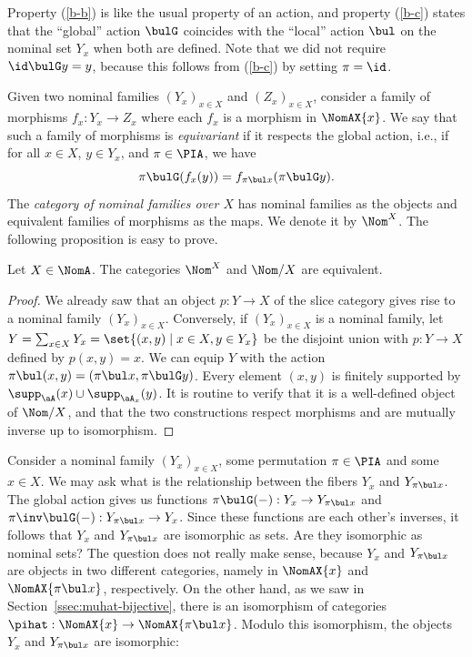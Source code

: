 \documentclass[twoside,11pt]{entics}
\begin{document}
Property (\ref{b-b}) is like the usual property of an action, and
property (\ref{b-c}) states that the ``global'' action $\bulG$
coincides with the ``local'' action $\bul$ on the nominal set $Y_x$
when both are defined. Note that we did not require $\id\bulG y =
y$, because this follows from (\ref{b-c}) by setting $\pi=\id$.

Given two nominal families $(Y_x)_{x\in X}$ and $(Z_x)_{x\in X}$,
consider a family of morphisms $f_x:Y_x\to Z_x$ where each $f_x$ is a
morphism in $\NomAX{x}$. We say that such a family of morphisms is
\emph{equivariant} if it respects the global action, i.e., if for all
$x\in X$, $y\in Y_x$, and $\pi\in\PIA$, we have
\[
\pi\bulG (f_x(y)) = f_{\pi\bul x}(\pi\bulG y).
\]
The \emph{category of nominal families over $X$} has nominal families
as the objects and equivalent families of morphisms as the maps. We
denote it by $\Nom^X$. The following proposition is easy to prove.

\begin{xprop}\label{prop:nom-x-equivalent}
  Let $X\in\NomA$. The categories $\Nom^X$ and $\Nom/X$ are equivalent.
\end{xprop}

\begin{proof}
  We already saw that an object $p:Y\to X$ of the slice category gives
  rise to a nominal family $(Y_x)_{x\in X}$. Conversely, if
  $(Y_x)_{x\in X}$ is a nominal family, let $Y=\sum_{x\in X} Y_x =
  \set{(x,y)\mid x\in X, y\in Y_x}$ be the disjoint union with $p:Y\to
  X$ defined by $p(x,y) = x$. We can equip $Y$ with the action
  $\pi\bul(x,y) = (\pi\bul x, \pi\bulG y)$. Every element
  $(x,y)$ is finitely supported by
  $\supp_{\aA}(x)\cup\supp_{\aA_{x}}(y)$.  It is routine to verify
  that it is a well-defined object of $\Nom/X$, and that the two
  constructions respect morphisms and are mutually inverse up to
  isomorphism.
\end{proof}

Consider a nominal family $(Y_x)_{x\in X}$, some permutation
$\pi\in\PIA$ and some $x\in X$. We may ask what is the
relationship between the fibers $Y_x$ and $Y_{\pi\bul x}$. The
global action gives us functions $\pi\bulG(-):Y_x\to Y_{\pi\bul
  x}$ and $\pi\inv\bulG(-):Y_{\pi\bul x}\to Y_x$. Since these
functions are each other's inverses, it follows that $Y_x$ and
$Y_{\pi\bul x}$ are isomorphic as sets. Are they isomorphic as
nominal sets?  The question does not really make sense, because $Y_x$
and $Y_{\pi\bul x}$ are objects in two different categories, namely
in $\NomAX{x}$ and $\NomAX{\pi\bul x}$, respectively. On the other
hand, as we saw in Section~\ref{ssec:muhat-bijective}, there is an
isomorphism of categories $\pihat:\NomAX{x}\to\NomAX{\pi\bul
  x}$. Modulo this isomorphism, the objects $Y_x$ and $Y_{\pi\bul
  x}$ are isomorphic:
\end{document}
